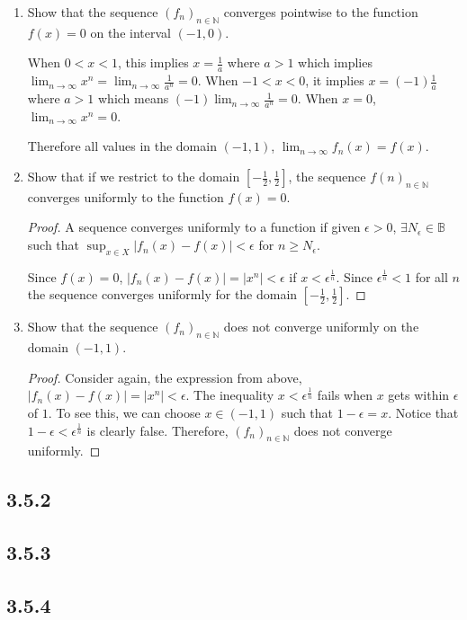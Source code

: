 \documentclass{tufte-book}
\theoremstyle{mytheoremstyle}
\theoremstyle{mylemstyle}
\theoremstyle{mydefstyle}
\begin{document}
\begin{enumerate}

\item Show that the sequence $(f_n)_{n \in \mathbb{N}}$ converges pointwise to the function $f(x) = 0$ on the interval $(-1,0)$.

When $0 < x < 1$, this implies $x = \frac{1}{a}$ where $a > 1$ which implies $\lim_{n \to \infty} x^n = \lim_{n \to \infty} \frac{1}{a^n} = 0$.  When $-1 < x < 0$, it implies $x=(-1)\frac{1}{a}$ where $a > 1$ which means $(-1)\lim_{n \to \infty}\frac{1}{a^n} = 0$.  When $x=0$, $\lim_{n \to \infty} x^n = 0$. 

Therefore all values in the domain $(-1,1)$, $\lim_{n \to \infty}f_n(x) = f(x)$.

\item Show that if we restrict to the domain $[-\frac{1}{2}, \frac{1}{2}]$, the sequence $f(n)_{n \in \mathbb{N}}$ converges uniformly to the function $f(x) = 0$.

\begin{proof}
A sequence converges uniformly to a function if given $\epsilon >0$, $\exists N_\epsilon \in \mathbb{B}$ such that $\sup_{x \in X}|f_n(x) - f(x)| < \epsilon$ for $n \geq N_\epsilon$.

Since $f(x) = 0$, $|f_n(x) - f(x)| = |x^n| < \epsilon$ if $x < \epsilon^\frac{1}{n}$.  Since $\epsilon^\frac{1}{n} < 1$ for all $n$ the sequence converges uniformly for the domain $[-\frac{1}{2}, \frac{1}{2}]$.
\end{proof}

\item Show that the sequence $(f_n)_{n \in \mathbb{N}}$ does not converge uniformly on the domain $(-1,1)$.

\begin{proof}
Consider again, the expression from above, $|f_n(x) - f(x)| = |x^n| < \epsilon$.  The inequality $x < \epsilon^\frac{1}{n}$ fails when $x$ gets within $\epsilon$ of $1$.  To see this, we can choose $x \in (-1,1)$ such that $1-\epsilon = x$. Notice that $1-\epsilon < \epsilon^\frac{1}{n}$ is clearly false.  Therefore, $(f_n)_{n \in \mathbb{N}}$ does not converge uniformly.
\end{proof}

\end{enumerate}
\subsection{3.5.2}

\subsection{3.5.3}

\subsection{3.5.4}
\end{document}
